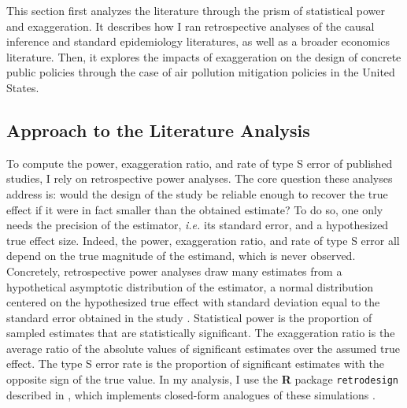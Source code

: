 \documentclass[12pt]{article}
\begin{document}
	This section first analyzes the literature through the prism of statistical power and exaggeration. It describes how I ran retrospective analyses of the causal inference and standard epidemiology literatures, as well as a broader economics literature. Then, it explores the impacts of exaggeration on the design of concrete public policies through the case of air pollution mitigation policies in the United States.
	    
	\subsection{Approach to the Literature Analysis}
    
		To compute the power, exaggeration ratio, and rate of type S error of published studies, I rely on retrospective power analyses. The core question these analyses address is: would the design of the study be reliable enough to recover the true effect if it were in fact smaller than the obtained estimate? To do so, one only needs the precision of the estimator, \textit{i.e.} its standard error, and a hypothesized true effect size. Indeed, the power, exaggeration ratio, and rate of type S error all depend on the true magnitude of the estimand, which is never observed. Concretely, retrospective power analyses draw many estimates from a hypothetical asymptotic distribution of the estimator, a normal distribution centered on the hypothesized true effect with standard deviation equal to the standard error obtained in the study \citep{gelman_beyond_2014}. Statistical power is the proportion of sampled estimates that are statistically significant. The exaggeration ratio is the average ratio of the absolute values of significant estimates over the assumed true effect. The type S error rate is the proportion of significant estimates with the opposite sign of the true value. In my analysis, I use the \textbf{\textsf{R}} package \texttt{retrodesign} described in \cite{timm_retrodesign_2019}, which implements closed-form analogues of these simulations \citep{lu_note_2019}.
		
\end{document}
